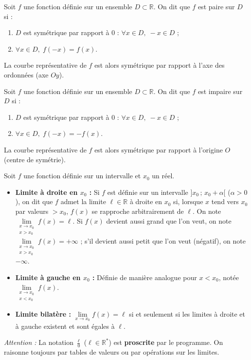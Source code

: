 \documentclass[11pt]{article}
\newcommand{\cle}[1]{{\popxbold\color{popdark}#1}}
\newcounter{popsec}
\newcounter{popsub}
\newcommand{\courssub}[1]{%
  \stepcounter{popsub}%
  \par\vspace{9pt}\noindent{\popxbold\fontsize{11.5}{13}\selectfont\color{popink}{\color{poporange}\thepopsec.\thepopsub}\hspace{6pt}#1}\par\nopagebreak\vspace{4pt}
}
\begin{document}
\courssub{Ressources à mobiliser}

\begin{definition}
Soit $f$ une fonction définie sur un ensemble $D \subset \mathbb{R}$. On dit que $f$ est \cle{paire} sur $D$ si :
\begin{enumerate}
\item $D$ est symétrique par rapport à $0$ : $\forall x \in D,\; -x \in D$ ;
\item $\forall x \in D,\; f(-x) = f(x)$.
\end{enumerate}
La courbe représentative de $f$ est alors symétrique par rapport à l'axe des ordonnées (axe $Oy$).
\end{definition}

\begin{definition}
Soit $f$ une fonction définie sur un ensemble $D \subset \mathbb{R}$. On dit que $f$ est \cle{impaire} sur $D$ si :
\begin{enumerate}
\item $D$ est symétrique par rapport à $0$ : $\forall x \in D,\; -x \in D$ ;
\item $\forall x \in D,\; f(-x) = -f(x)$.
\end{enumerate}
La courbe représentative de $f$ est alors symétrique par rapport à l'origine $O$ (centre de symétrie).
\end{definition}

\begin{propriete}
Soit $f$ une fonction définie sur un intervalle et $x_0$ un réel.
\begin{itemize}
\item \textbf{Limite à droite en $x_0$ :} Si $f$ est définie sur un intervalle $]x_0\,;\,x_0+\alpha[$ ($\alpha>0$), on dit que $f$ admet la limite $\ell \in \mathbb{R}$ à droite en $x_0$ si, lorsque $x$ tend vers $x_0$ par valeurs $> x_0$, $f(x)$ se rapproche arbitrairement de $\ell$. On note $\lim\limits_{\substack{x \to x_0 \\ x > x_0}} f(x) = \ell$. Si $f(x)$ devient aussi grand que l'on veut, on note $\lim\limits_{\substack{x \to x_0 \\ x > x_0}} f(x) = +\infty$ ; s'il devient aussi petit que l'on veut (négatif), on note $-\infty$.
\item \textbf{Limite à gauche en $x_0$ :} Définie de manière analogue pour $x < x_0$, notée $\lim\limits_{\substack{x \to x_0 \\ x < x_0}} f(x)$.
\item \textbf{Limite bilatère :} $\lim\limits_{x \to x_0} f(x) = \ell$ si et seulement si les limites à droite et à gauche existent et sont égales à $\ell$.
\end{itemize}
\emph{Attention :} La notation $\frac{\ell}{0}$ ($\ell \in \mathbb{R}^*$) est \textbf{proscrite} par le programme. On raisonne toujours par tables de valeurs ou par opérations sur les limites.
\end{propriete}
\end{document}
